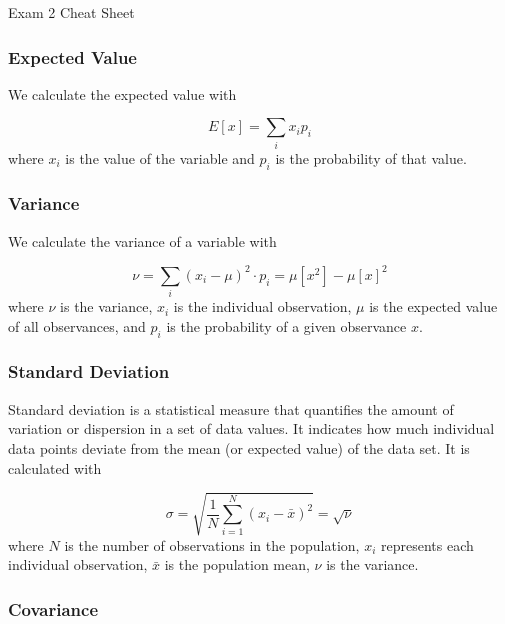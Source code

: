 \begin{cheatsheet}{Exam 2 Cheat Sheet}
{        \subsubsection*{Expected Value}
    
        We calculate the expected value with
    
        \begin{equation*}
            E[x] = \sum_{i} x_{i}p_{i}
        \end{equation*}
        where $x_{i}$ is the value of the variable and $p_{i}$ is the probability of that value.
    
        \subsubsection*{Variance}
    
        We calculate the variance of a variable with
    
        \begin{equation*}
            \nu = \sum_{i}(x_{i} - \mu)^{2} \cdot p_{i} = \mu[x^{2}] - \mu[x]^2
        \end{equation*}
        where $\nu$ is the variance, $x_{i}$ is the individual observation, $\mu$ is the expected value of all observances, and $p_{i}$ is the probability of a given observance $x$.
    
        \subsubsection*{Standard Deviation}
    
        Standard deviation is a statistical measure that quantifies the amount of variation or dispersion in a set of data values. It indicates how much individual data points deviate from the mean 
        (or expected value) of the data set. It is calculated with
    
        \begin{equation*}
            \sigma = \sqrt{\frac{1}{N}\sum_{i=1}^{N}(x_i - \bar{x})^2} = \sqrt{\nu}
        \end{equation*}
        where $N$ is the number of observations in the population, $x_i$ represents each individual observation, $\bar{x}$ is the population mean, $\nu$ is the variance.
    
        \subsubsection*{Covariance}
    
}
\end{cheatsheet}
